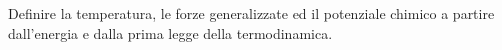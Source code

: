 \question  Definire la temperatura, le forze generalizzate ed il potenziale chimico a partire dall'energia e dalla prima legge della termodinamica.
